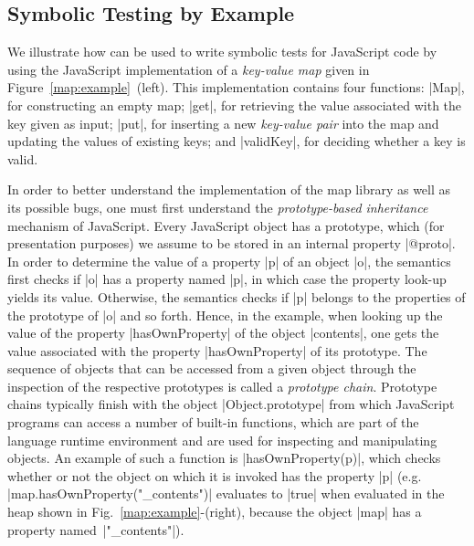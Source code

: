 \subsection{Symbolic Testing by Example} 
\label{symbolic:testing}

We illustrate how \jilette can be used to write symbolic tests for JavaScript code by using the JavaScript implementation 
of a  \emph{key-value map} given in Figure~\ref{map:example}~(left). 
This implementation contains four functions: 
\jsinline|Map|, for constructing an empty map;
\jsinline|get|, for retrieving the value associated with the key given as input;
\jsinline|put|, for inserting a new \emph{key-value pair} into the map and updating the values of existing keys; and
\jsinline|validKey|, for deciding whether a key is valid.

In order to better understand the implementation of the map library as well as its possible bugs, 
one must first understand the \emph{prototype-based inheritance} mechanism of JavaScript. 
Every JavaScript object has a prototype, which (for presentation purposes) we assume to 
be stored  in an internal property \jsinline|@proto|. In order to determine the value of a property
\jsinline|p| of an object \jsinline|o|, the semantics first checks if \jsinline|o| has a 
property named \jsinline|p|, in which case the property look-up yields its value. Otherwise, the 
semantics checks if \jsinline|p| belongs to the properties of the prototype of \jsinline|o| and so 
forth. Hence, in the example, when looking up the value of the property \jsinline|hasOwnProperty|
of the object \jsinline|contents|, one gets the value associated with the property  \jsinline|hasOwnProperty|
of its prototype.
The sequence of objects that can be accessed from a given object through the inspection 
of the respective prototypes is called a \emph{prototype chain}.
Prototype chains typically finish with the object \jsinline|Object.prototype| from which JavaScript 
programs can access a number of built-in functions, which are part of the language runtime environment and are used for inspecting and manipulating objects.
An example of such a function is \jsinline|hasOwnProperty(p)|, which checks whether or not the object 
on which it is invoked has the property \jsinline|p| (e.g. {\small \jsinline|map.hasOwnProperty("_contents")|}
evaluates to \jsinline|true| when evaluated in the heap shown in Fig.~\ref{map:example}-(right), 
because the object \jsinline|map| has a property named~\jsinline|"_contents"|). 

